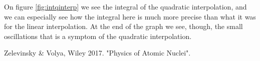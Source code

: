 \documentclass[a4paper,reprint,nofootinbib,aps,pra]{revtex4-1}
\begin{document}
On figure \ref{fig:intqinterp} we see the integral of the quadratic interpolation, and we can especially see how the integral here is much more precise than what it was for the linear interpolation.
At the end of the graph we see, though, the small oscillations that is a symptom of the quadratic interpolation.

\begin{thebibliography}{}
 Zelevinsky \& Volya, Wiley 2017.  "Physics of Atomic Nuclei".

\end{thebibliography}
\end{document}
